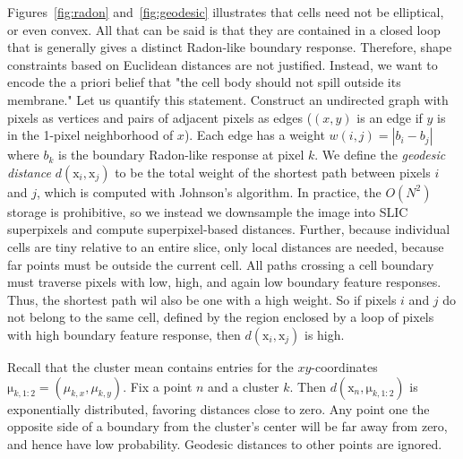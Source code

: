 \documentclass[english]{article}
\newcommand{\+}[1]{\ensuremath{\boldsymbol{\mathrm{#1}}}}
\begin{document}
Figures~\ref{fig:radon} and~\ref{fig:geodesic} illustrates that cells need not be elliptical, or even convex. All that can be said is that they are contained in a closed loop that is generally gives a distinct Radon-like boundary response. Therefore, shape constraints based on Euclidean distances are not justified. Instead, we want to encode the a priori belief that "the cell body should not spill outside its membrane." Let us quantify this statement. Construct an undirected graph with pixels as vertices and pairs of adjacent pixels as edges ($(x,y)$ is an edge if $y$ is in the 1-pixel neighborhood of $x$). Each edge has a weight $w(i,j) = \left| b_i - b_j \right|$ where $b_k$ is the boundary Radon-like response at pixel $k$. We define the \emph{geodesic distance} $d(\+{x}_i, \+{x}_j)$ to be the total weight of the shortest path between pixels $i$ and $j$, which is computed with Johnson's algorithm. In practice, the $O(N^2)$ storage is prohibitive, so we instead we downsample the image into SLIC superpixels \cite{Achanta2012} and compute superpixel-based distances. Further, because individual cells are tiny relative to an entire slice, only local distances are needed, because far points must be outside the current cell. All paths crossing a cell boundary must traverse pixels with low, high, and again low boundary feature responses. Thus, the shortest path wil also be one with a high weight. So if pixels $i$ and $j$ do not belong to the same cell, defined by the region enclosed by a loop of pixels with high boundary feature response, then $d(\+{x}_i, \+{x}_j)$ is high.

Recall that the cluster mean contains entries for the $xy$-coordinates $\+{\mu}_{k,1:2} = (\mu_{k,x}, \mu_{k,y})$. Fix a point $n$ and a cluster $k$. Then $d(\+{x}_n, \+{\mu}_{k,1:2})$ is exponentially distributed, favoring distances close to zero. Any point one the opposite side of a boundary from the cluster's center will be far away from zero, and hence have low probability. Geodesic distances to other points are ignored.
\end{document}

